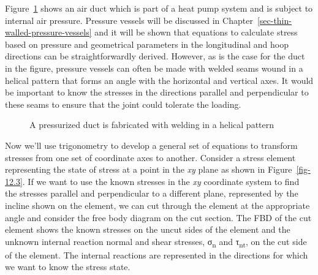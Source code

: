 \documentclass[
  letterpaper,
  DIV=11,
  numbers=noendperiod]{scrreprt}
\theoremstyle{definition}
\theoremstyle{remark}
\begin{document}
Figure~\ref{fig-12.2} shows an air duct which is part of a heat pump
system and is subject to internal air pressure. Pressure vessels will be
discussed in Chapter~\ref{sec-thin-walled-pressure-vessels} and it will
be shown that equations to calculate stress based on pressure and
geometrical parameters in the longitudinal and hoop directions can be
straightforwardly derived. However, as is the case for the duct in the
figure, pressure vessels can often be made with welded seams wound in a
helical pattern that forms an angle with the horizontal and vertical
axes. It would be important to know the stresses in the directions
parallel and perpendicular to these seams to ensure that the joint could
tolerate the loading.

\begin{figure}


\caption{\label{fig-12.2}A pressurized duct is fabricated with welding
in a helical pattern}

\end{figure}%

Now we'll use trigonometry to develop a general set of equations to
transform stresses from one set of coordinate axes to another. Consider
a stress element representing the state of stress at a point in the
\emph{xy} plane as shown in Figure~\ref{fig-12.3}. If we want to use the
known stresses in the \emph{xy} coordinate system to find the stresses
parallel and perpendicular to a different plane, represented by the
incline shown on the element, we can cut through the element at the
appropriate angle and consider the free body diagram on the cut section.
The FBD of the cut element shows the known stresses on the uncut sides
of the element and the unknown internal reaction normal and shear
stresses, σ\textsubscript{n} and τ\textsubscript{nt}, on the cut side of
the element. The internal reactions are represented in the directions
for which we want to know the stress state.
\end{document}
